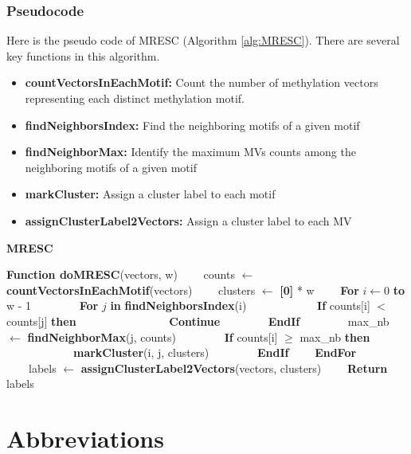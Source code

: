 \documentclass[12pt,letterpaper]{article}
\begin{document}
\subsubsection{Pseudocode}

Here is the pseudo code of MRESC (Algorithm \ref{alg:MRESC}). There are several key 
functions in this algorithm.

\begin{itemize}
    \item  \textbf{countVectorsInEachMotif:} Count the number of methylation vectors representing each 
    distinct methylation motif.
    \item  \textbf{findNeighborsIndex:} Find the neighboring motifs of a given motif
    \item  \textbf{findNeighborMax:} Identify the maximum MVs counts among the neighboring motifs of a given motif
    \item  \textbf{markCluster:} Assign a cluster label to each motif
    \item  \textbf{assignClusterLabel2Vectors:} Assign a cluster label to each MV
\end{itemize}

\begin{algorithm}[ht]
    \caption{\textbf{MRESC}}
    \label{alg:MRESC}
    \begin{algorithmic}
        \STATE \textbf{Function doMRESC}(vectors, w)
        \STATE \ \ \ \ counts $\gets$ \textbf{countVectorsInEachMotif}(vectors)
        \STATE \ \ \ \ clusters $\gets$ \textbf{[0]} * w
        \STATE \ \ \ \ \textbf{For} $i \gets 0$ \textbf{to} w - 1
        \STATE \ \ \ \ \ \ \ \ \textbf{For} $j$ \textbf{in} \textbf{findNeighborsIndex}(i)
        \STATE \ \ \ \ \ \ \ \ \ \ \ \ \textbf{If} counts[i] $<$ counts[j] \textbf{then}
        \STATE \ \ \ \ \ \ \ \ \ \ \ \ \ \ \ \ \textbf{Continue}
        \STATE \ \ \ \ \ \ \ \ \textbf{EndIf}
        \STATE \ \ \ \ \ \ \ \ max\_nb $\gets$ \textbf{findNeighborMax}(j, counts)
        \STATE \ \ \ \ \ \ \ \ \textbf{If} counts[i] $\geq$ max\_nb \textbf{then}
        \STATE \ \ \ \ \ \ \ \ \ \ \ \ \textbf{markCluster}(i, j, clusters)
        \STATE \ \ \ \ \ \ \ \ \textbf{EndIf}
        \STATE \ \ \ \ \textbf{EndFor}
        \STATE \ \ \ \ labels $\gets$ \textbf{assignClusterLabel2Vectors}(vectors, clusters)
        \STATE \ \ \ \ \textbf{Return} labels
        \end{algorithmic}
\end{algorithm}

\section{Abbreviations}\label{sec:abbr}
\end{document}
